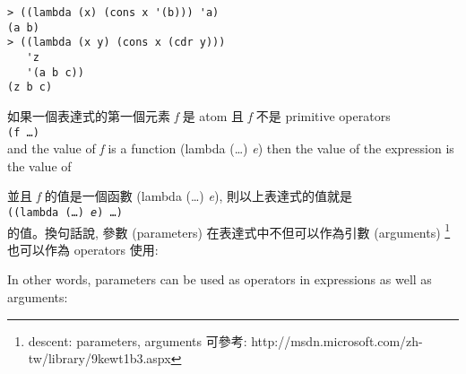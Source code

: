 \documentclass[12pt]{article}
\begin{document}
\begin{CJK}{UTF8}{bsmi}
\begin{verbatim} 
> ((lambda (x) (cons x '(b))) 'a) 
(a b) 
> ((lambda (x y) (cons x (cdr y))) 
   'z 
   '(a b c)) 
(z b c) 
\end{verbatim} 
如果一個表達式的第一個元素 {\it f} 是 atom 且 {\it f} 不是 primitive
operators\\
{\tt (f \aone\dots\an) }\\ 

and the value of {\it f} is a function (lambda (\pone\dots\pn) {\it e})
then the value of the expression is the value of

並且 {\it f} 的值是一個函數 (lambda (\pone\dots\pn) {\it e}),
則以上表達式的值就是\\
{\tt ((lambda (\pone\dots\pn) {\it e}) \aone\dots\an) }\\ 
的值。換句話說, 參數 (parameters) 在表達式中不但可以作為引數 (arguments)
\footnote{descent: parameters, arguments 可參考: http://msdn.microsoft.com/zh-tw/library/9kewt1b3.aspx}
也可以作為 operators 使用: 

In other words, parameters can be used as operators in expressions as well as
arguments:


\end{CJK}
\end{document}
